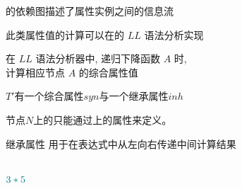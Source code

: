 \begin{frame}{}
  \begin{center}
    的依赖图描述了属性实例之间的信息流

    \vspace{0.80cm}
    此类属性值的计算可以在的 $LL$ 语法分析实现

    \pause
    \vspace{0.80cm}
    在 $LL$ 语法分析器中, 递归下降函数 $A$  时, \\[3pt]
    计算相应节点 $A$ 的综合属性值
  \end{center}
\end{frame}

\begin{frame}{}
  \begin{center}
    $T'$有一个综合属性$syn$与一个继承属性$inh$


    \begin{definition}
      节点$N$上的只能通过上的属性来定义。
    \end{definition}
  \end{center}
\end{frame}

\begin{frame}{}
  \begin{center}
    继承属性  用于在表达式中从左向右传递中间计算结果

    \vspace{0.50cm}
    \begin{columns}

        \[
            \textcolor{teal}{3 \ast 5}
        \]
    \end{columns}

    \pause
    \vspace{0.40cm}
  \end{center}
\end{frame}

